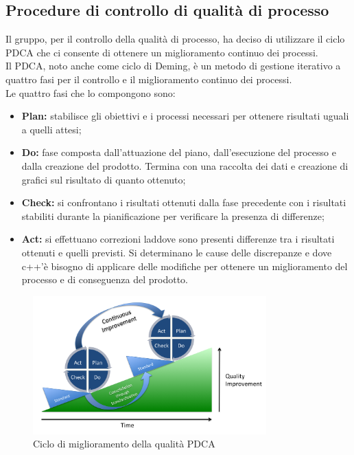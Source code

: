 	\subsection{Procedure di controllo di qualità di processo}
	Il gruppo, per il controllo della qualità di processo, ha deciso di utilizzare il ciclo PDCA\gloss{} che ci consente di ottenere un miglioramento continuo dei processi.\\
	Il PDCA\gloss{}, noto anche come ciclo di Deming, è un metodo di gestione iterativo a quattro fasi per il controllo e il miglioramento continuo dei processi.\\
	Le quattro fasi che lo compongono sono:
		\begin{itemize}
			\item \textbf{Plan:} stabilisce gli obiettivi e i processi necessari per ottenere risultati uguali a quelli attesi;
			\item \textbf{Do:} fase composta dall'attuazione del piano, dall'esecuzione del processo e dalla creazione del prodotto. Termina con una raccolta dei dati e creazione di grafici sul risultato di quanto ottenuto;
			\item \textbf{Check:} si confrontano i risultati ottenuti dalla fase precedente con i risultati stabiliti durante la pianificazione per verificare la presenza di differenze;
			\item \textbf{Act:} si effettuano correzioni laddove sono presenti differenze tra i risultati ottenuti e quelli previsti. Si determinano le cause delle discrepanze e dove c++\gloss{}'è bisogno di applicare delle modifiche per ottenere un miglioramento del processo e di conseguenza del prodotto.
		\end{itemize}
		\begin{figure}[h]
			\centering
			\includegraphics[width=90mm]{images/pdca.png}
			\caption{Ciclo di miglioramento della qualità PDCA}
			\label{fig:pdca}
		\end{figure}
	
